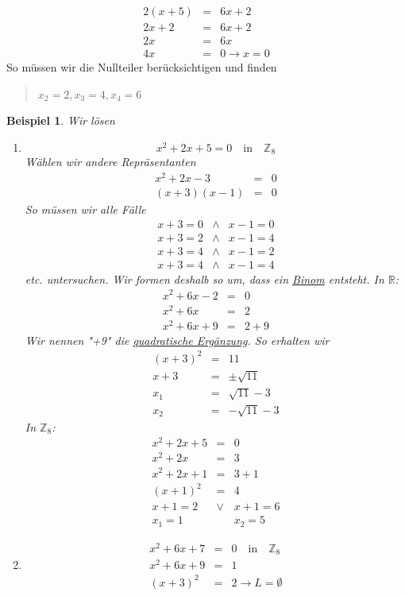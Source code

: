 \documentclass{report}
\newtheorem{myexample}{Beispiel}
\begin{document}
\begin{eqnarray}2(x + 5) & = & 6x + 2\nonumber \\
2x + 2 & = & 6x + 2\nonumber \\
2x & = & 6x\nonumber \\
4x & = & 0 \to x = 0\end{eqnarray}
So müssen wir die Nullteiler berücksichtigen und finden
\begin{quote}$x_2 = 2, x_3=4, x_4 = 6$\end{quote}
\begin{myexample}Wir lösen
\begin{enumerate}
\item \begin{equation}x^2 + 2x + 5 = 0 \quad \mbox{in} \quad \mathbb{Z}_8\end{equation}
Wählen wir andere Repräsentanten
\begin{eqnarray}x^2 + 2x - 3 & = & 0\nonumber \\
(x + 3)(x - 1) & = & 0\end{eqnarray}
So müssen wir alle Fälle
\begin{eqnarray}x + 3 = 0 & \land & x - 1 = 0\nonumber \\
x + 3 = 2 & \land & x - 1 = 4\nonumber \\
x + 3 = 4 & \land & x - 1 = 2\nonumber \\
x + 3 = 4 & \land & x - 1 = 4\end{eqnarray}
etc. untersuchen. Wir formen deshalb so um, dass ein \underline{Binom} entsteht. In $\mathbb{R}$:
\begin{eqnarray}x^2 + 6x - 2 & = & 0\nonumber \\
x^2 + 6x & = & 2\nonumber \\
x^2 + 6x + 9 & = & 2 + 9\end{eqnarray}
Wir nennen "+9" die \underline{quadratische Ergänzung}. So erhalten wir
\begin{eqnarray}(x + 3)^2 & = & 11\nonumber \\
x + 3 & = & \pm \sqrt{11}\nonumber \\
x_1 & = & \sqrt{11} - 3\nonumber \\
x_2 & = & -\sqrt{11} - 3\end{eqnarray}
In $\mathbb{Z}_8$:
\begin{eqnarray}x^2 + 2x + 5 & = & 0\nonumber \\
x^2 + 2x & = & 3\nonumber \\
x^2 + 2x + 1 & = & 3 + 1 \nonumber \\
(x + 1)^2 & = & 4 \nonumber \\
x + 1 = 2 & \lor & x + 1 = 6 \nonumber \\
x_1 = 1 & & x_2 = 5 \end{eqnarray}
\item \begin{eqnarray}x^2 + 6x + 7 & = & 0 \quad \mbox{in} \quad \mathbb{Z}_8\nonumber \\
x^2 + 6x + 9 & = & 1\nonumber \\
(x + 3)^2 & = & 2 \to L = \emptyset \end{eqnarray}
\end{enumerate}\end{myexample}
\end{document}
